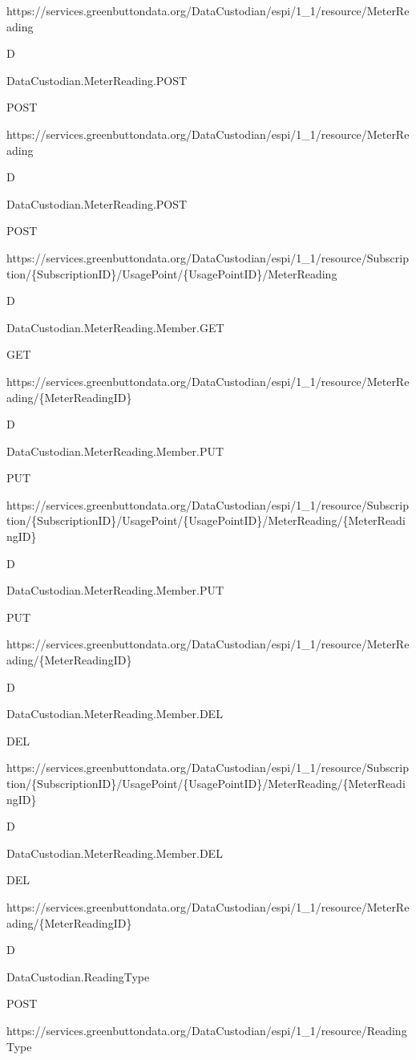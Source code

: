 \documentclass[a4paper,12pt,single,pdftex]{scrbook}
\begin{document}
https://services.greenbuttondata.org/DataCustodian/espi/1\_1/resource/MeterReading

D

DataCustodian.MeterReading.POST

POST

https://services.greenbuttondata.org/DataCustodian/espi/1\_1/resource/MeterReading

D

DataCustodian.MeterReading.POST

POST

https://services.greenbuttondata.org/DataCustodian/espi/1\_1/resource/Subscription/\{SubscriptionID\}/UsagePoint/\{UsagePointID\}/MeterReading

D

DataCustodian.MeterReading.Member.GET

GET

https://services.greenbuttondata.org/DataCustodian/espi/1\_1/resource/MeterReading/\{MeterReadingID\}

D

DataCustodian.MeterReading.Member.PUT

PUT

https://services.greenbuttondata.org/DataCustodian/espi/1\_1/resource/Subscription/\{SubscriptionID\}/UsagePoint/\{UsagePointID\}/MeterReading/\{MeterReadingID\}

D

DataCustodian.MeterReading.Member.PUT

PUT

https://services.greenbuttondata.org/DataCustodian/espi/1\_1/resource/MeterReading/\{MeterReadingID\}

D

DataCustodian.MeterReading.Member.DEL

DEL

https://services.greenbuttondata.org/DataCustodian/espi/1\_1/resource/Subscription/\{SubscriptionID\}/UsagePoint/\{UsagePointID\}/MeterReading/\{MeterReadingID\}

D

DataCustodian.MeterReading.Member.DEL

DEL

https://services.greenbuttondata.org/DataCustodian/espi/1\_1/resource/MeterReading/\{MeterReadingID\}

D

DataCustodian.ReadingType

POST

https://services.greenbuttondata.org/DataCustodian/espi/1\_1/resource/ReadingType
\end{document}
